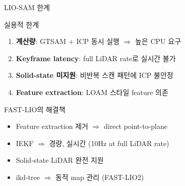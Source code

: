 \begin{frame}{LIO-SAM 한계}
  \begin{alertblock}{실용적 한계}
    \begin{enumerate}
      \item \textbf{계산량}: GTSAM + ICP 동시 실행 $\Rightarrow$ 높은 CPU 요구
      \item \textbf{Keyframe latency}: full LiDAR rate로 실시간 불가
      \item \textbf{Solid-state 미지원}: 비반복 스캔 패턴에 ICP 불안정
      \item \textbf{Feature extraction}: LOAM 스타일 feature 의존
    \end{enumerate}
  \end{alertblock}
  \pause
  \begin{block}{FAST-LIO의 해결책}
    \begin{itemize}
      \item Feature extraction 제거 $\Rightarrow$ direct point-to-plane
      \item IEKF $\Rightarrow$ 경량, 실시간 (10Hz at full LiDAR rate)
      \item Solid-state LiDAR 완전 지원
      \item ikd-tree $\Rightarrow$ 동적 map 관리 (FAST-LIO2)
    \end{itemize}
  \end{block}
\end{frame}


